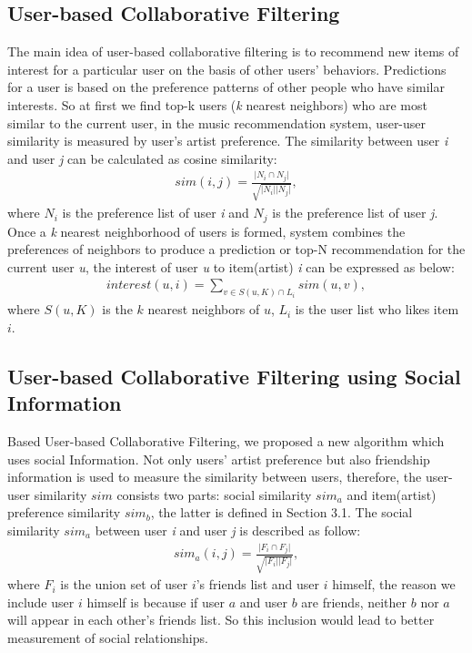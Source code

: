 \documentclass{sig-alternate}
\begin{document}
\subsection{User-based Collaborative Filtering}
The main idea of user-based collaborative filtering is to recommend new items of interest for a particular user on the basis of other users' behaviors. Predictions for a user is based on the preference patterns of other people who have similar interests. So at first we find top-k users (\textsl{k} nearest neighbors) who are most similar to the current user, in the music recommendation system, user-user similarity is measured by user's artist preference. The similarity between user \textsl{i} and user \textsl{j} can be calculated as cosine similarity:
\begin{gather*}
sim(i, j)= \frac{\vert N_i  \cap N_j \vert}{\sqrt{\vert N_i \vert \vert N_j \vert}},
\end{gather*}
\indent where $N_i$ is the preference list of user \textsl{i} and $N_j$ is the preference list of user \textsl{j}.\\
\indent Once a \textsl{k} nearest neighborhood of users is formed, system combines the preferences of neighbors to produce a prediction or top-N recommendation for the current user \textsl{u}, the interest of user \textsl{u} to item(artist) \textsl{i} can be expressed as below:
\begin{gather*}
interest(u, i)= \sum_{v \in S(u, K) \cap L_i} sim(u, v),
\end{gather*}
\indent where $S(u, K)$ is the $k$ nearest neighbors of $u$, $L_i$ is the user list who likes item $i$.
\subsection{User-based Collaborative Filtering using Social Information}
Based User-based Collaborative Filtering, we proposed a new algorithm which uses social Information. Not only users' artist preference but also friendship information is used to measure the similarity between users, therefore, the user-user similarity $sim$ consists two parts: social similarity $sim_a$ and item(artist) preference similarity $sim_b$, the latter is defined in Section 3.1. The social similarity $sim_a$ between user \textsl{i} and user \textsl{j} is described as follow:
\begin{gather*}
sim_a(i, j)= \frac{\vert F_i  \cap F_j \vert}{\sqrt{\vert F_i \vert \vert F_j \vert}},
\end{gather*}
\indent where $F_i$ is the union set of user $i$'s friends list and user $i$ himself, the reason we include user $i$ himself is because if user $a$ and user $b$ are friends, neither $b$ nor $a$ will appear in each other's friends list. So this inclusion would lead to better measurement of social relationships.
\end{document}
